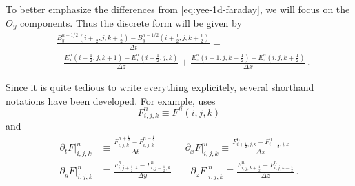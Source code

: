 \documentclass[12pt, class=report, crop=false]{standalone}
\begin{document}
To better emphasize the differences from \cref{eq:yee-1d-faraday}, we will focus on the
\(O_y\) components. Thus the discrete form will be given by
\begin{equation}
  \label{eq:yee-3d-faraday-y}
  \begin{aligned}
    &\frac{B_y^{n+1/2}(i+\frac{1}{2},j,k+\frac{1}{2})
    - B_y^{n-1/2}(i+\frac{1}{2},j,k+\frac{1}{2})}{\Delta t} = \\
    &- \frac{E_x^{n}(i+\frac{1}{2},j,k+1) - E_x^{n}(i+\frac{1}{2},j,k)}{\Delta z}
    + \frac{E_z^{n}(i+1,j,k+\frac{1}{2}) - E_z^{n}(i,j,k+\frac{1}{2})}{\Delta x}\,.
  \end{aligned}
\end{equation}

Since it is quite tedious to write everything explicitely, several shorthand
notations have been developed. For example, \textcite{lehe_electromagneticparticleincell_2018}
uses
\[
F^n_{i,j,k} \equiv F^n(i,j,k)
\]
and
\begin{align*}
  \partial_t F \rvert^n_{i,j,k} &\equiv \frac{F^{n+\frac{1}{2}}_{i,j,k} - F^{n-\frac{1}{2}}_{i,j,k}}{\Delta t} \qquad\quad
  \partial_x F \rvert^n_{i,j,k} \equiv \frac{F^n_{i+\frac{1}{2},j,k} - F^n_{i-\frac{1}{2},j,k}}{\Delta x} \\
  \partial_y F \rvert^n_{i,j,k} &\equiv \frac{F^n_{i,j+\frac{1}{2},k} - F^n_{i,j-\frac{1}{2},k}}{\Delta y} \qquad
  \partial_z F \rvert^n_{i,j,k} \equiv \frac{F^n_{i,j,k+\frac{1}{2}} - F^n_{i,j,k-\frac{1}{2}}}{\Delta z} \,.
\end{align*}
\end{document}
